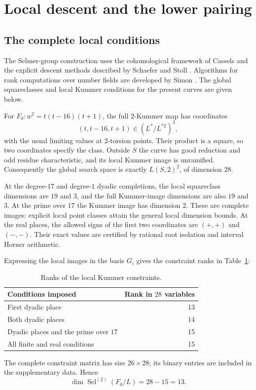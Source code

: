 \documentclass[11pt,a4paper]{article}
\theoremstyle{definition}\newtheorem{definition}[theorem]{Definition}
\theoremstyle{remark}\newtheorem{remark}[theorem]{Remark}
\newcommand{\Sel}{\operatorname{Sel}}\newcommand{\rank}{\operatorname{rank}}
\begin{document}
\section{Local descent and the lower pairing}\label{sec:lower}

\subsection{The complete local conditions}

The Selmer-group construction uses the cohomological framework of Cassels \cite{CasselsIII} and the explicit descent methods described by Schaefer and Stoll \cite{SchaeferStoll}. Algorithms for rank computations over number fields are developed by Simon \cite{Simon}. The global squareclasses and local Kummer conditions for the present curves are given below.

For $F_0:w^2=t(t-16)(t+1)$, the full $2$-Kummer map has coordinates
\[
(t,t-16,t+1)\in(L^*/L^{*2})^3,
\]
with the usual limiting values at $2$-torsion points. Their product is a
square, so two coordinates specify the class. Outside $S$ the curve has
good reduction and odd residue characteristic, and its local Kummer image
is unramified. Consequently the global search space is exactly
$L(S,2)^2$, of dimension $28$.

At the degree-$17$ and degree-$1$ dyadic completions, the local
squareclass dimensions are $19$ and $3$, and the full Kummer-image
dimensions are also $19$ and $3$. At the prime over $17$ the Kummer
image has dimension $2$. These are complete images: explicit local point
classes attain the general local dimension bounds. At the real places,
the allowed signs of the first two coordinates are $(+,+)$ and $(-,-)$.
Their exact values are certified by rational root isolation and interval
Horner arithmetic.

Expressing the local images in the basis $G_i$ gives the constraint ranks in Table~\ref{tab:3}:
\begin{table}[htbp]
\centering\caption{Ranks of the local Kummer constraints.}\label{tab:3}
\begin{tabular}{lr}
\toprule
Conditions imposed&Rank in $28$ variables\\\midrule
First dyadic place&13\\
Both dyadic places&14\\
Dyadic places and the prime over $17$&15\\
All finite and real conditions&15\\\bottomrule
\end{tabular}
\end{table}
The complete constraint matrix has size $26\times28$; its binary entries are included in the supplementary data. Hence
\[
\dim\Sel^{(2)}(F_0/L)=28-15=13.
\]
\end{document}
